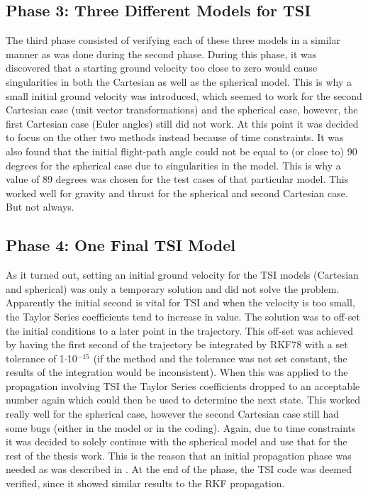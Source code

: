 \subsection{Phase 3: Three Different Models for \ac{TSI}}
\label{subsec:phase3com}
The third phase consisted of verifying each of these three models in a similar manner as was done during the second phase. During this phase, it was discovered that a starting ground velocity too close to zero would cause singularities in both the Cartesian as well as the spherical model. This is why a small initial ground velocity was introduced, which seemed to work for the second Cartesian case (unit vector transformations) and the spherical case, however, the first Cartesian case (Euler angles) still did not work. At this point it was decided to focus on the other two methods instead because of time constraints. It was also found that the initial flight-path angle could not be equal to (or close to) 90 degrees for the spherical case due to singularities in the model. This is why a value of 89 degrees was chosen for the test cases of that particular model. This worked well for gravity and thrust for the spherical and second Cartesian case. But not always.

\subsection{Phase 4: One Final \ac{TSI} Model}
\label{subsec:phase4com}
As it turned out, setting an initial ground velocity for the \ac{TSI} models (Cartesian and spherical) was only a temporary solution and did not solve the problem. Apparently the initial second is vital for \ac{TSI} and when the velocity is too small, the Taylor Series coefficients tend to increase in value. The solution was to off-set the initial conditions to a later point in the trajectory. This off-set was achieved by having the first second of the trajectory be integrated by \ac{RKF78} with a set tolerance of 1$\cdot$10$^{-15}$ (if the method and the tolerance was not set constant, the results of the integration would be inconsistent). When this was applied to the propagation involving \ac{TSI} the Taylor Series coefficients dropped to an acceptable number again which could then be used to determine the next state. This worked really well for the spherical case, however the second Cartesian case still had some bugs (either in the model or in the coding). Again, due to time constraints it was decided to solely continue with the spherical model and use that for the rest of the thesis work. This is the reason that an initial propagation phase was needed as was described in . At the end of the phase, the \ac{TSI} code was deemed verified, since it showed similar results to the \ac{RKF} propagation. 

